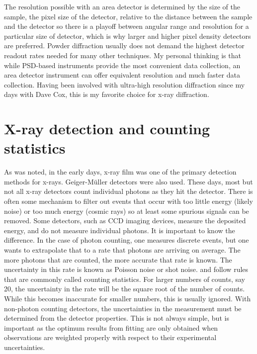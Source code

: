 The resolution possible with an area detector is determined by the size of the sample, the pixel size of the detector, relative to the distance between the sample and the detector so there is a playoff between angular range and resolution for a particular size of detector, which is why larger and higher pixel density detectors are preferred. Powder diffraction usually does not demand the highest detector readout rates needed for many other techniques. My personal thinking is that while PSD-based instruments provide the most convenient data collection, an area detector instrument can offer equivalent resolution and much faster data collection. Having been involved with ultra-high resolution diffraction since my days with Dave Cox, this is my favorite choice for x-ray diffraction. 

\section{X-ray detection and counting statistics}\label{ref:CountingStatistics}
As was noted, in the early days, x-ray film was one of the primary detection methods for x-rays. Geiger-Müller detectors were also used. These days, most but not all x-ray detectors count individual photons as they hit the detector. There is often some mechanism to filter out events that occur with too little energy (likely noise) or too much energy (cosmic rays) so at least some spurious signals can be removed. Some detectors, such as CCD imaging devices, measure the deposited energy, and do not measure individual photons. It is important to know the difference. In the case of photon counting, one measures discrete events, but one wants to extrapolate that to a rate that photons are arriving on average. The more photons that are counted, the more accurate that rate is known. The uncertainty in this rate is known as Poisson noise or shot noise. and follow rules that are commonly called counting statistics. For larger numbers of counts, say 20, the uncertainty in the rate will be the square root of the number of counts. While this becomes inaccurate for smaller numbers, this is usually ignored. With non-photon counting detectors, the uncertainties in the measurement must be determined from the detector properties. This is not always simple, but is important as the optimum results from fitting are only obtained when observations are weighted properly with respect to their experimental uncertainties. 

